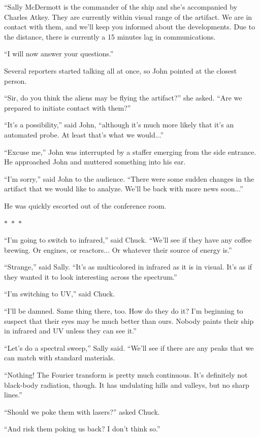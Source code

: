 \documentclass{memoir}
\newcommand{\starbreak}{%
\begin{center}
  $\ast$~$\ast$~$\ast$
\end{center}
}
\begin{document}
``Sally McDermott is the commander of the ship and she's accompanied by Charles Atkey. They are currently within visual range of the artifact. We are in contact with them, and we'll keep you informed about the developments. Due to the distance, there is currently a 15 minutes lag in communications.

``I will now answer your questions.''

Several reporters started talking all at once, so John pointed at the closest person.

``Sir, do you think the aliens may be flying the artifact?'' she asked. ``Are we prepared to initiate contact with them?''

``It's a possibility,'' said John, ``although it's much more likely that it's an automated probe. At least that's what we would...''

``Excuse me,'' John was interrupted by a staffer emerging from the side entrance. He approached John and muttered something into his ear.

``I'm sorry,'' said John to the audience. ``There were some sudden changes in the artifact that we would like to analyze. We'll be back with more news soon...''

He was quickly escorted out of the conference room.

\starbreak

``I'm going to switch to infrared,'' said Chuck. ``We'll see if they have any coffee brewing. Or engines, or reactors... Or whatever their source of energy is.''

``Strange,'' said Sally. ``It's as multicolored in infrared as it is in visual. It's as if they wanted it to look interesting across the spectrum.''

``I'm switching to UV,'' said Chuck. 

``I'll be damned. Same thing there, too. How do they do it? I'm beginning to suspect that their eyes may be much better than ours. Nobody paints their ship in infrared and UV unless they can see it.''

``Let's do a spectral sweep,'' Sally said. ``We'll see if there are any peaks that we can match with standard materials.

``Nothing! The Fourier transform is pretty much continuous. It's definitely not black-body radiation, though. It has undulating hills and valleys, but no sharp lines.''

``Should we poke them with lasers?'' asked Chuck.

``And risk them poking us back? I don't think so.''
\end{document}
